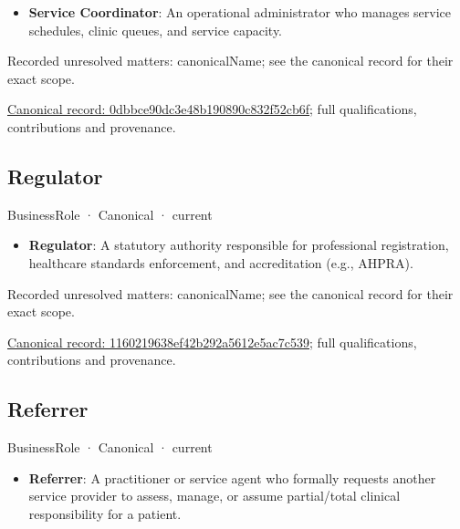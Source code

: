 \begin{itemize}


\item \textbf{Service Coordinator}: An operational administrator who manages service schedules, clinic queues, and service capacity.

\end{itemize}

{\small Recorded unresolved matters: canonicalName; see the canonical record for their exact scope.}\par
{\footnotesize \href{../../../../continuum/business/business-role/0dbbce90dc3e48b190890c832f52cb6f.md}{Canonical record: 0dbbce90dc3e48b190890c832f52cb6f}; full qualifications, contributions and provenance.}\par
\subsection{Regulator}

\label{element:1160219638ef42b292a5612e5ac7c539}
{\small BusinessRole · Canonical · current}\par

\begin{itemize}


\item \textbf{Regulator}: A statutory authority responsible for professional registration, healthcare standards enforcement, and accreditation (e.g., AHPRA).

\end{itemize}

{\small Recorded unresolved matters: canonicalName; see the canonical record for their exact scope.}\par
{\footnotesize \href{../../../../continuum/business/business-role/1160219638ef42b292a5612e5ac7c539.md}{Canonical record: 1160219638ef42b292a5612e5ac7c539}; full qualifications, contributions and provenance.}\par
\subsection{Referrer}

\label{element:197b811fc8594cc3a68a372b74008ba0}
{\small BusinessRole · Canonical · current}\par

\begin{itemize}


\item \textbf{Referrer}: A practitioner or service agent who formally requests another service provider to assess, manage, or assume partial/total clinical responsibility for a patient.

\end{itemize}

